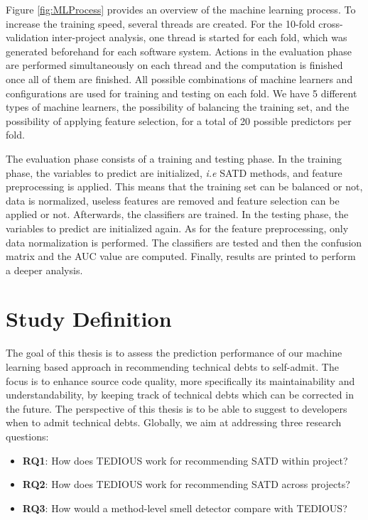  
 Figure \ref{fig:MLProcess} provides an overview of the machine learning process. To increase the training speed, several threads are created. For the 10-fold cross-validation inter-project analysis, one thread is started for each fold, which was generated beforehand for each software system. Actions in the evaluation phase are performed simultaneously on each thread and the computation is finished once all of them are finished. All possible combinations of machine learners and configurations are used for training and testing on each fold. We have 5 different types of machine learners, the possibility of balancing the training set, and the possibility of applying feature selection, for a total of 20 possible predictors per fold. \par
 
 The evaluation phase consists of a training and testing phase. In the training phase, the variables to predict are initialized, \emph{i.e} \ac{SATD} methods, and feature preprocessing is applied. This means that the training set can be balanced or not, data is normalized, useless features are removed and feature selection can be applied or not. Afterwards, the classifiers are trained. In the testing phase, the variables to predict are initialized again. As for the feature preprocessing, only data normalization is performed. The classifiers are tested and then the confusion matrix and the AUC value are computed. Finally, results are printed to perform a deeper analysis.
 
\section{Study Definition}


The goal of this thesis is to assess the prediction performance of our machine learning based approach in recommending technical debts to self-admit. The focus is to enhance source code quality, more specifically its maintainability and understandability, by keeping track of technical debts which can be corrected in the future. The perspective of this thesis is to be able to suggest to developers when to admit technical debts. Globally, we aim at addressing three research questions:

\begin{itemize}
	\item \textbf{RQ1}: How does \ac{TEDIOUS} work for recommending \ac{SATD} within project?
	\item \textbf{RQ2}: How does \ac{TEDIOUS} work for recommending \ac{SATD} across projects?
	\item \textbf{RQ3}: How would a method-level smell detector compare with \ac{TEDIOUS}?
\end{itemize}

